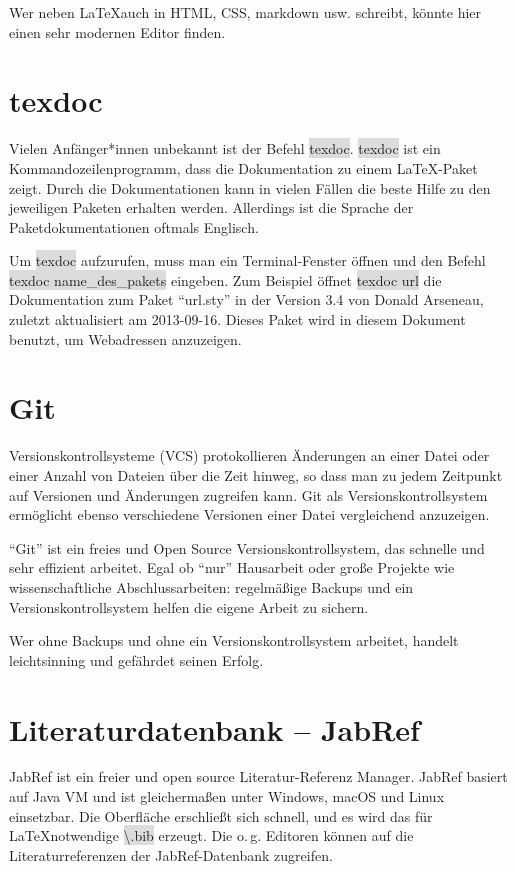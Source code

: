 \documentclass[12pt,	%
				headings=small,		%
				toc=bibliography,	%
			]	%
{scrreprt}		%
\newcommand{\inlinecode}[1]{\colorbox{Gainsboro}{\textsf{\textbackslash#1}}} %
\newcommand{\inlinebefehl}[1]{\colorbox{Gainsboro}{\textsf{#1}}} %
\begin{document}
	Wer neben \LaTeX auch in HTML, CSS, markdown usw. schreibt, könnte hier einen sehr modernen Editor finden.


\section{texdoc}
\label{texdoc}
Vielen Anfänger*innen unbekannt ist der Befehl \inlinebefehl{texdoc}. \inlinebefehl{texdoc} ist ein Kommandozeilenprogramm, dass die Dokumentation zu einem \LaTeX-Paket zeigt. Durch die Dokumentationen kann in vielen Fällen die beste Hilfe zu den jeweiligen Paketen erhalten werden. Allerdings ist die Sprache der Paketdokumentationen oftmals Englisch. 

Um  \inlinebefehl{texdoc} aufzurufen, muss man ein Terminal-Fenster öffnen und den Befehl \\\inlinebefehl{texdoc name\_des\_pakets} eingeben. Zum Beispiel öffnet \inlinebefehl{texdoc url} die Dokumentation zum Paket \enquote{url.sty} in der Version 3.4 von Donald Arseneau, zuletzt aktualisiert am 2013-09-16. Dieses Paket wird in diesem Dokument benutzt, um Webadressen anzuzeigen.

\section{Git}
\label{Git}
Versionskontrollsysteme (VCS) protokollieren Änderungen an einer Datei oder einer Anzahl von Dateien über die Zeit hinweg, so dass man zu jedem Zeitpunkt auf Versionen und Änderungen zugreifen kann. Git als Versionskontrollsystem ermöglicht ebenso verschiedene Versionen einer Datei vergleichend anzuzeigen.

\enquote{Git} ist ein freies und Open Source Versionskontrollsystem, das schnelle und sehr effizient arbeitet.\autocite{ProGit} Egal ob \enquote{nur} Hausarbeit oder große Projekte wie wissenschaftliche Abschlussarbeiten: regelmäßige Backups und ein Versionskontrollsystem helfen die eigene Arbeit zu sichern. 

Wer ohne Backups und ohne ein Versionskontrollsystem arbeitet, handelt leichtsinning und gefährdet seinen Erfolg.


\section{Literaturdatenbank – JabRef}
\label{JabRef}
JabRef ist ein freier und  open source Literatur-Referenz Manager. JabRef basiert auf Java VM und ist gleichermaßen unter Windows, macOS und Linux einsetzbar. Die Oberfläche erschließt sich schnell, und es wird das für \LaTeX notwendige \inlinecode{*.bib} erzeugt. Die o.\,g. Editoren können auf die Literaturreferenzen der JabRef-Datenbank zugreifen.\autocite{JabRef}
\end{document}
